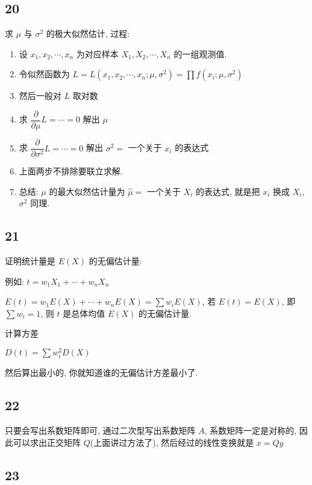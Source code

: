\documentclass[a4paper, draft]{article}
\begin{document}
\subsection*{20}

求 $\mu$ 与 $\sigma^2$ 的极大似然估计, 过程:

\begin{enumerate}
    \item 设 $x_1,x_2,\cdots,x_n$ 为对应样本 $X_1,X_2,\cdots,X_n$ 的一组观测值.
    \item 令似然函数为 $L=L(x_1,x_2,\cdots,x_n;\mu,\sigma^2)=\prod f(x_i;\mu,\sigma^2)$
    \item 然后一般对 $L$ 取对数
    \item 求 $\dfrac{\partial}{\partial \mu}L=\cdots=0$ 解出 $\mu$
    \item 求 $\dfrac{\partial}{\partial \sigma^2}L=\cdots=0$ 解出 $\sigma^2=$ 一个关于 $x_i$ 的表达式
    \item 上面两步不排除要联立求解.
    \item 总结: $\mu$ 的最大似然估计量为 $\hat{\mu}=$ 一个关于 $X_i$ 的表达式, 就是把 $x_i$ 换成 $X_i$, $\sigma^2$ 同理.
\end{enumerate}


\subsection*{21}

证明统计量是 $E(X)$ 的无偏估计量: 

例如: $t=w_1X_1+\cdots+w_nX_n$

$E(t)=w_1E(X)+\cdots+w_nE(X)=\sum w_iE(X)$, 
若 $E(t)=E(X)$, 即 $\sum w_i=1$, 则 $t$ 是总体均值 $E(X)$ 的无偏估计量.

计算方差

$D(t)=\sum w_i^2D(X)$

然后算出最小的, 你就知道谁的无偏估计方差最小了.

\subsection*{22}

只要会写出系数矩阵即可, 通过二次型写出系数矩阵 $A$, 
系数矩阵一定是对称的, 因此可以求出正交矩阵 $Q$(上面讲过方法了), 
然后经过的线性变换就是 $x=Qy$

\subsection*{23}
\end{document}
